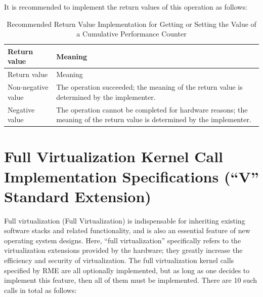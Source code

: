 It is recommended to implement the return values of this operation as follows:

\begin{xltabular}{\textwidth}{@{}>{\hsize\raggedright\arraybackslash}X>{\hsize\raggedright\arraybackslash}X@{}}
\caption{Recommended Return Value Implementation for Getting or Setting the Value of a Cumulative Performance Counter}\label{tab:8-71-get-or-set-cumulative-performance-counter-suggested-return-values}\\
\toprule
Return value & Meaning\tabularnewline
\endfirsthead
\toprule
Return value & Meaning\tabularnewline
\midrule
\endhead
\bottomrule
\endlastfoot
    Non-negative value & The operation succeeded; the meaning of the return value is determined by the implementer.\tabularnewline
    Negative value & The operation cannot be completed for hardware reasons; the meaning of the return value is determined by the implementer.\tabularnewline
\end{xltabular}
\nopagebreak[4]

\section{Full Virtualization Kernel Call Implementation Specifications (``V'' Standard Extension)}\label{sec:8-full-virtualization-kernel-calls}
\nopagebreak[4]

Full virtualization (Full
Virtualization) is indispensable for inheriting existing software stacks and related functionality, and is also an essential feature of new operating system designs. Here, ``full virtualization'' specifically refers to the virtualization extensions provided by the hardware; they greatly increase the efficiency and security of virtualization. The full virtualization kernel calls specified by RME are all optionally implemented, but as long as one decides to implement this feature, then all of them must be implemented. There are 10 such calls in total as follows:

